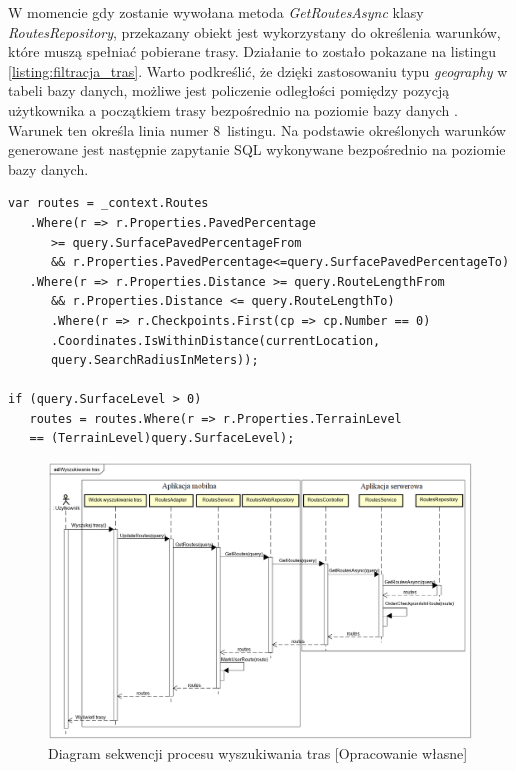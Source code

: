 W momencie gdy zostanie wywołana metoda \textit{GetRoutesAsync} klasy \textit{RoutesRepository}, przekazany obiekt jest wykorzystany do określenia warunków, które muszą spełniać pobierane trasy. Działanie to zostało pokazane na listingu \ref{listing:filtracja_tras}. Warto podkreślić, że dzięki zastosowaniu typu \textit{geography} w tabeli bazy danych, możliwe jest policzenie odległości pomiędzy pozycją użytkownika a początkiem trasy bezpośrednio na poziomie bazy danych \cite{geography-type, geography-type2}. Warunek ten określa linia numer 8~listingu. Na podstawie określonych warunków generowane jest następnie zapytanie SQL wykonywane bezpośrednio na poziomie bazy danych.
\begin{lstlisting}[caption={Określenie warunków dla pobieranych tras},label=listing:filtracja_tras]
var routes = _context.Routes
   .Where(r => r.Properties.PavedPercentage 
      >= query.SurfacePavedPercentageFrom
      && r.Properties.PavedPercentage<=query.SurfacePavedPercentageTo)
   .Where(r => r.Properties.Distance >= query.RouteLengthFrom
      && r.Properties.Distance <= query.RouteLengthTo)
      .Where(r => r.Checkpoints.First(cp => cp.Number == 0)
      .Coordinates.IsWithinDistance(currentLocation,
      query.SearchRadiusInMeters));

if (query.SurfaceLevel > 0)
   routes = routes.Where(r => r.Properties.TerrainLevel 
   == (TerrainLevel)query.SurfaceLevel);
\end{lstlisting}
\begin{figure}[h]\label{fig:api_model}
\begin{center}
\includegraphics[width=\textwidth]{img/diagram_sekwencji_wyszukiwanie.png}
\caption{Diagram sekwencji procesu wyszukiwania tras [Opracowanie własne]}\label{image:sekwencja_wyszukiwanie}
\end{center}
\end{figure}
